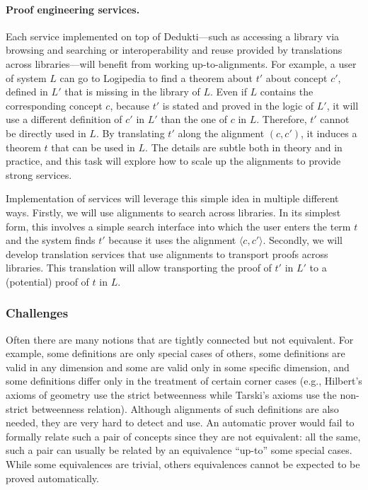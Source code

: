 \paragraph*{Proof engineering services.}
Each service implemented on top of Dedukti---such as accessing a
library via browsing and searching or interoperability and reuse
provided by translations across libraries---will benefit from working
up-to-alignments. For example, a user of system $L$ can go to
Logipedia to find a theorem about $t'$ about concept $c'$, defined in
$L'$ that is missing in the library of $L$. Even if $L$ contains the
corresponding concept $c$, because $t'$ is stated and proved in the
logic of $L'$, it will use a different definition of $c'$ in $L'$ than
the one of $c$ in $L$.  Therefore, $t'$ cannot be directly used in
$L$. By translating $t'$ along the alignment $(c,c')$, it induces a
theorem $t$ that can be used in $L$. The details are subtle both in
theory and in practice, and this task will explore how to scale up the
alignments to provide strong services.

Implementation of services will leverage this simple idea in multiple
different ways. Firstly, we will use alignments to search across
libraries. In its simplest form, this involves a simple search
interface into which the user enters the term $t$ and the system finds
$t'$ because it uses the alignment $\langle c,c'\rangle$. Secondly, we
will develop translation services that use alignments to transport
proofs across libraries. This translation will allow transporting the
proof of $t'$ in $L'$ to a (potential) proof of $t$ in $L$.


\subsubsection*{Challenges}

Often there are many notions that are tightly connected but not
equivalent.
%
For example, some definitions are only special cases of others,
some definitions are valid in any dimension and some
are valid only in some specific dimension, and some definitions differ
only in the treatment of certain corner cases (e.g., Hilbert's axioms of
geometry use the strict betweenness while Tarski's axioms use the
non-strict betweenness relation).  Although alignments of such
definitions are also needed, they are very hard to detect and use. An
automatic prover would fail to formally relate such a pair of concepts
since they are not equivalent: all the same, such a pair can usually
be related by an equivalence ``up-to'' some special cases.  While some
equivalences are trivial, others equivalences cannot be expected to be
proved automatically.

